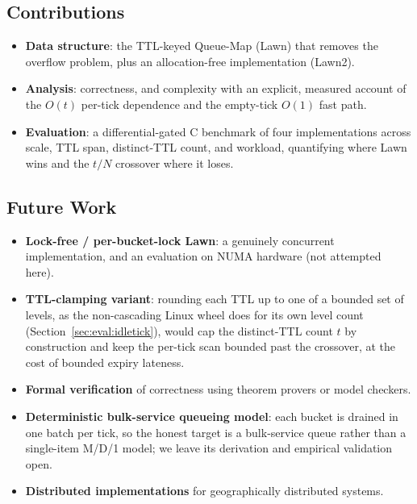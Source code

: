 \documentclass[conference]{IEEEtran}
\begin{document}
\subsection{Contributions}
\label{sec:contributions}
\begin{itemize}
    \item \textbf{Data structure}: the TTL-keyed Queue-Map (Lawn) that removes the overflow problem, plus an allocation-free implementation (Lawn2).
    \item \textbf{Analysis}: correctness, and complexity with an explicit, measured account of the $O(t)$ per-tick dependence and the empty-tick $O(1)$ fast path.
    \item \textbf{Evaluation}: a differential-gated C benchmark of four implementations across scale, TTL span, distinct-TTL count, and workload, quantifying where Lawn wins and the $t/N$ crossover where it loses.
\end{itemize}

\subsection{Future Work}
\label{sec:future-work}
\begin{itemize}
    \item \textbf{Lock-free / per-bucket-lock Lawn}: a genuinely concurrent implementation, and an evaluation on NUMA hardware (not attempted here).
    \item \textbf{TTL-clamping variant}: rounding each TTL up to one of a bounded set of levels, as the non-cascading Linux wheel does for its own level count (Section~\ref{sec:eval:idletick}), would cap the distinct-TTL count $t$ by construction and keep the per-tick scan bounded past the crossover, at the cost of bounded expiry lateness.
    \item \textbf{Formal verification} of correctness using theorem provers or model checkers.
    \item \textbf{Deterministic bulk-service queueing model}: each bucket is drained in one batch per tick, so the honest target is a bulk-service queue rather than a single-item M/D/1 model; we leave its derivation and empirical validation open.
    \item \textbf{Distributed implementations} for geographically distributed systems.
\end{itemize}




\end{document}
